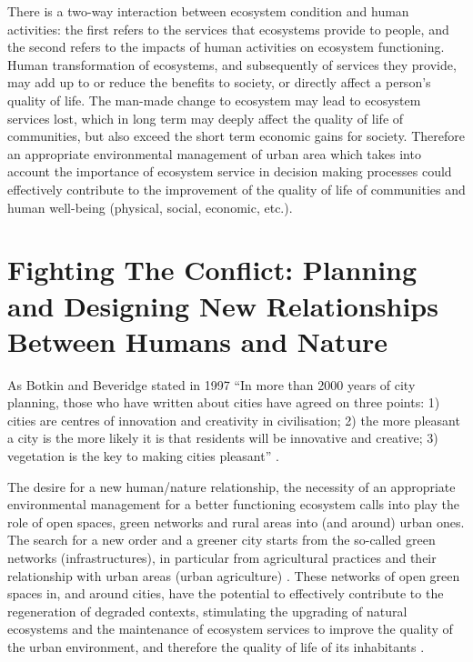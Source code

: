 \documentclass[10pt,a4paper]{article}
\begin{document}
\begin{multicols}{2}
There is a two-way interaction between ecosystem condition and human activities: the first refers to the services that ecosystems provide to people, and the second refers to the impacts of human activities on ecosystem functioning. Human transformation of ecosystems, and subsequently of services they provide, may add up to or reduce the benefits to society, or directly affect a person's quality of life. The man-made change to ecosystem may lead to ecosystem services lost, which in long term may deeply affect the quality of life of communities, but also exceed the short term economic gains for society. Therefore an appropriate environmental management of urban area which takes into account the importance of ecosystem service in decision making processes could effectively contribute to the improvement of the quality of life of communities and human well-being (physical, social, economic, etc.).

\section{Fighting The Conflict: Planning and Designing New Relationships Between Humans and Nature}
\noindent As Botkin and Beveridge stated in 1997 ``In more than 2000 years of city planning, those who have written about cities have agreed on three points: 1) cities are centres of innovation and creativity in civilisation; 2) the more pleasant a city is the more likely it is that residents will be innovative and creative; 3) vegetation is the key to making cities pleasant'' \citep{r27}.

The desire for a new human/nature relationship, the necessity of an appropriate environmental management for a better functioning ecosystem calls into play the role of open spaces, green networks and rural areas into (and around) urban ones. The search for a new order and a greener city starts from the so-called green networks (infrastructures), in particular from agricultural practices and their relationship with urban areas (urban agriculture) \citep{r28, r29, r30}. These networks of open green spaces in, and around cities, have the potential to effectively contribute to the regeneration of degraded contexts, stimulating the upgrading of natural ecosystems and the maintenance of ecosystem services to improve the quality of the urban environment, and therefore the quality of life of its inhabitants \citep{r31}.


\end{multicols}
\end{document}
